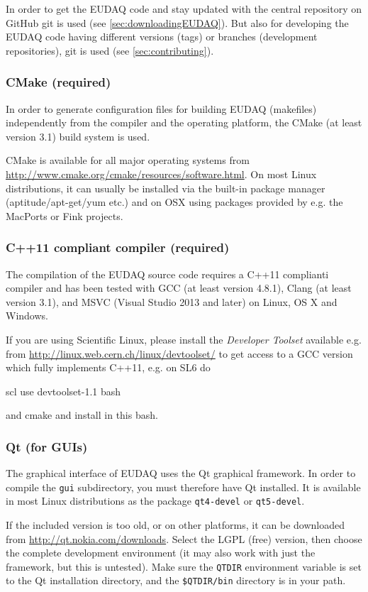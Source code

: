 In order to get the EUDAQ code and stay updated with the central repository on GitHub git is used (see \autoref{sec:downloadingEUDAQ}).
But also for developing the EUDAQ code having different versions (tags) or branches (development repositories), git is used (see \autoref{sec:contributing}).


\subsubsection{CMake (required)}
In order to generate configuration files for building EUDAQ (makefiles) independently from the compiler and the operating platform, the CMake (at least version 3.1) build system is used.

CMake is available for all major operating systems from \url{http://www.cmake.org/cmake/resources/software.html}. 
On most Linux distributions, it can usually be installed via the built-in package manager (aptitude/apt-get/yum etc.) and on OSX using packages provided by e.g. the MacPorts or Fink projects.

\subsubsection{C++11 compliant compiler (required)}
The compilation of the EUDAQ source code requires a C++11 complianti compiler and has been tested with GCC (at least version 4.8.1), Clang (at least version 3.1), and MSVC (Visual Studio 2013 and later) on Linux, OS X and Windows.

If you are using Scientific Linux, please install the \emph{Developer Toolset} available e.g. from \url{http://linux.web.cern.ch/linux/devtoolset/} to get access to a GCC version which fully implements C++11, e.g. on SL6 do
\begin{listing}[mybash]
scl use devtoolset-1.1 bash
\end{listing}
and cmake and install in this bash.


\subsubsection{Qt (for GUIs)}
The graphical interface of EUDAQ uses the Qt graphical framework.
In order to compile the \texttt{gui} subdirectory, you must therefore have Qt installed.
It is available in most Linux distributions as the package \texttt{qt4-devel} or  \texttt{qt5-devel}.

If the included version is too old, or on other platforms,
it can be downloaded from \url{http://qt.nokia.com/downloads}.
Select the LGPL (free) version, then choose the complete development environment
(it may also work with just the framework, but this is untested).
Make sure the \texttt{QTDIR} environment variable is set to the Qt installation directory,
and the \texttt{\$QTDIR/bin} directory is in your path.

